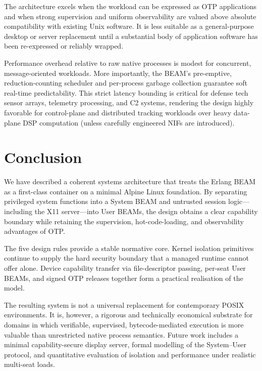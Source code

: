 \documentclass{article}
\begin{document}
The architecture excels when the workload can be expressed as OTP applications and when strong supervision and uniform observability are valued above absolute compatibility with existing Unix software.
It is less suitable as a general-purpose desktop or server replacement until a substantial body of application software has been re-expressed or reliably wrapped.

Performance overhead relative to raw native processes is modest for concurrent, message-oriented workloads. More importantly, the BEAM's pre-emptive, reduction-counting scheduler and per-process garbage collection guarantee soft real-time predictability. This strict latency bounding is critical for defense tech sensor arrays, telemetry processing, and C2 systems, rendering the design highly favorable for control-plane and distributed tracking workloads over heavy data-plane DSP computation (unless carefully engineered NIFs are introduced).

\section{Conclusion}

We have described a coherent systems architecture that treats the Erlang BEAM as a first-class container on a minimal Alpine Linux foundation.
By separating privileged system functions into a System BEAM and untrusted session logic---including the X11 server---into User BEAMs, the design obtains a clear capability boundary while retaining the supervision, hot-code-loading, and observability advantages of OTP.

The five design rules provide a stable normative core.
Kernel isolation primitives continue to supply the hard security boundary that a managed runtime cannot offer alone.
Device capability transfer via file-descriptor passing, per-seat User BEAMs, and signed OTP releases together form a practical realisation of the model.

The resulting system is not a universal replacement for contemporary POSIX environments.
It is, however, a rigorous and technically economical substrate for domains in which verifiable, supervised, bytecode-mediated execution is more valuable than unrestricted native process semantics.
Future work includes a minimal capability-secure display server, formal modelling of the System--User protocol, and quantitative evaluation of isolation and performance under realistic multi-seat loads.
\end{document}
